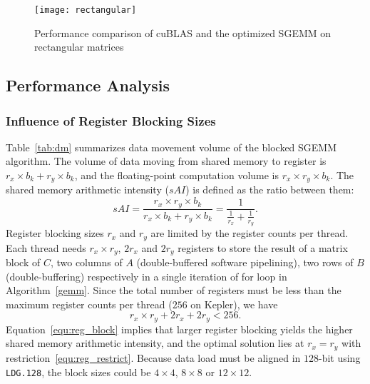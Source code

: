 \begin{figure*}[htbp]
\begin{center}
\texttt{[image: rectangular]}
\caption{Performance comparison of cuBLAS and the optimized SGEMM on rectangular matrices}
\label{fig:rect}
\end{center}
\end{figure*}


\subsection{Performance Analysis}

\subsubsection{Influence of Register Blocking Sizes}
Table~\ref{tab:dm} summarizes data movement volume of the blocked SGEMM algorithm.
The volume of data moving from shared memory to register is $r_x\times b_k+ r_y\times b_k$, 
and the floating-point computation volume is $r_x\times r_y\times b_k$. 
The shared memory arithmetic intensity ($sAI$) is defined as the ratio between them:
\begin{equation}
sAI = \frac {r_x\times 
r_y\times b_k} {r_x\times b_k+ r_y\times b_k} = \frac{1}{\frac{1}{r_x} + \frac{1}{r_y}}.
    \label{equ:reg_block}
\end{equation}
Register blocking sizes $r_x$ and $r_y$ are limited by the register counts per thread. 
Each thread needs $r_x\times r_y$, $2r_x$ and $2r_y$ registers to store the result of a matrix block of $C$,  two columns of $A$ (double-buffered software pipelining),  two rows of $B$ (double-buffering) respectively in a single iteration of for loop in Algorithm~\ref{gemm}.
Since the total number of registers must be less than the maximum register counts per thread ($256$ on Kepler), we have
\begin{equation}
    r_x\times r_y + 2r_x + 2r_y < 256.
\label{equ:reg_restrict}
\end{equation}
Equation~\ref{equ:reg_block} implies that larger register blocking yields the higher shared memory arithmetic intensity,
and the optimal solution lies at $r_x=r_y$ with restriction~\ref{equ:reg_restrict}. 
Because data load must be aligned in $128$-bit using 
{\tt LDG.128}, the block sizes could be $4\times 4$, $8\times 8$ or $12\times 12$. 

